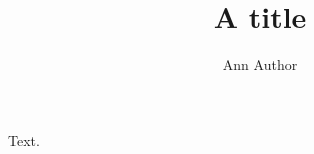 \documentclass{hha}
\title{A title}
\author{Ann Author}
\begin{document}
\maketitle
Text.
\end{document}
